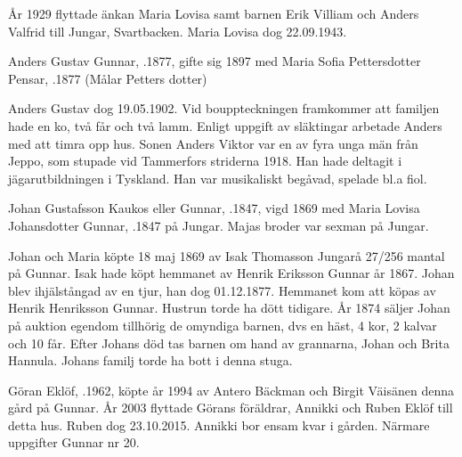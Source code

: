 År 1929 flyttade änkan Maria Lovisa samt barnen Erik Villiam och Anders Valfrid till Jungar, Svartbacken. Maria Lovisa dog 22.09.1943.


Anders Gustav Gunnar, .1877, gifte sig 1897 med Maria Sofia Pettersdotter Pensar, .1877 (Målar Petters dotter)
\begin{jhchildren}
  \item {}
  \item {}
  \item {}
\end{jhchildren}
Anders Gustav dog 19.05.1902. Vid bouppteckningen framkommer att familjen hade en ko, två får och två lamm. Enligt uppgift av släktingar arbetade Anders med att timra opp hus. Sonen Anders Viktor var en av fyra unga män från Jeppo, som stupade vid Tammerfors striderna 1918. Han hade deltagit i jägarutbildningen i Tyskland. Han var musikaliskt begåvad, spelade bl.a fiol.


Johan Gustafsson Kaukos eller Gunnar, .1847, vigd 1869 med Maria Lovisa Johansdotter Gunnar, .1847 på Jungar. Majas broder var sexman på Jungar.
\begin{jhchildren}
  \item {}
  \item {}
  \item {}
\end{jhchildren}
Johan och Maria köpte 18 maj 1869 av Isak Thomasson Jungarå 27/256 mantal på Gunnar. Isak hade köpt hemmanet av Henrik
Eriksson Gunnar år 1867. Johan blev ihjälstångad av en tjur, han dog 01.12.1877. Hemmanet kom att köpas av Henrik Henriksson Gunnar. Hustrun torde ha dött tidigare. År 1874 säljer Johan på auktion egendom tillhörig de omyndiga barnen, dvs en häst, 4 kor, 2 kalvar och 10 får. Efter Johans död tas barnen om hand av grannarna, Johan och Brita Hannula. Johans familj torde ha bott i denna stuga.




Göran Eklöf, .1962, köpte år 1994 av Antero Bäckman  och Birgit Väisänen denna gård på Gunnar. År 2003 flyttade Görans föräldrar, Annikki och Ruben Eklöf till detta hus. Ruben dog 23.10.2015. Annikki bor ensam kvar i gården. Närmare uppgifter Gunnar nr 20.

